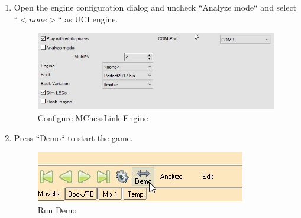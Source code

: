 \documentclass[11pt,a4paper]{article}
\begin{document}
\begin{enumerate}
\begin{figure}[H]
\end{figure}
\item Open the engine configuration dialog and uncheck ``Analyze mode`` and select ``\begin{math} <none> \end{math}`` as UCI engine.
\begin{figure}[H]
	\centering
	\includegraphics[scale=0.7]{Arena_ConfigureMChessLink.jpg}
	\caption{Configure MChessLink Engine}
	\label{fig:ArenaConfigureCertabo}
\end{figure}
\item Press ``Demo`` to start the game.
\begin{figure}[H]
	\centering
	\includegraphics[scale=0.7]{arena_demo.jpg}
	\caption{Run Demo}
	\label{fig:ArenaDemo}
\end{figure}
\end{enumerate}
\end{document}
